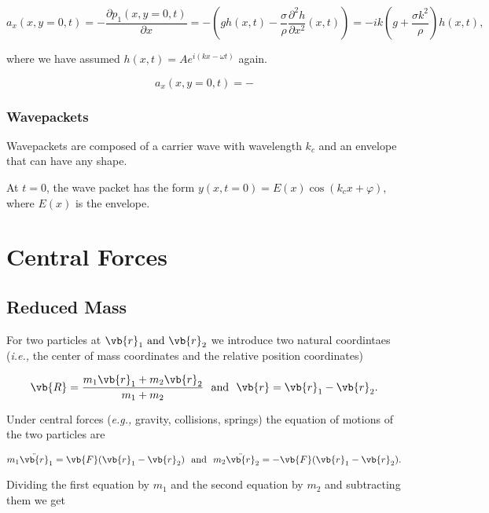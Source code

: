 \documentclass[a4paper,12pt]{report}
\begin{document}
\begin{equation}
	a_{x}(x,y=0,t) = -\frac{\partial p_1 (x,y=0,t)}{\partial x} =- \left( gh(x,t) - \frac{\sigma }{\rho } \frac{\partial^2 h}{\partial x^2}(x,t)  \right) = -ik\left( g+\frac{\sigma k^2}{\rho }  \right) h(x,t),  
\end{equation}

where we have assumed \(h(x,t) = A e^{i(kx - \omega t)} \) again.

\begin{equation}
	a_{x}(x,y=0,t) = - 
\end{equation}

\subsection{Wavepackets}

Wavepackets are composed of a carrier wave with wavelength \(k_{c} \) and an envelope that can have any shape. 

At \(t=0\), the wave packet has the form \(y(x,t=0) = E(x)\cos (k_{c}x+\varphi  )\), where \(E(x)\) is the envelope.   

\chapter{Central Forces}

\section{Reduced Mass}

For two particles at \(\vb{r} _{1} \text { and } \vb{r} _{2}  \) we introduce two natural coordintaes (\textit{i.e.,} the center of mass coordinates and the relative position coordinates)

\begin{equation}
	\vb{R} = \frac{m_1 \vb{r} _{1} + m_2 \vb{r} _{2}  }{m_1 + m_2 } ~\text { and }~ \vb{r} = \vb{r} _{1} - \vb{r} _{2}  .   
\end{equation}

Under central forces (\textit{e.g.,} gravity, collisions, springs) the equation of motions of the two particles are 

\begin{equation}
	m_1 \ddot{\vb{r}}_{1} = \vb{F} (\vb{r} _{1}-\vb{r} _{2}  ) ~\text { and }~ m_2 \ddot{\vb{r} }_{2} = - \vb{F} (\vb{r} _{1}-\vb{r} _{2}  ).     
\end{equation}

Dividing the first equation by \(m_1 \) and the second equation by \(m_2 \) and subtracting them we get 
\end{document}
